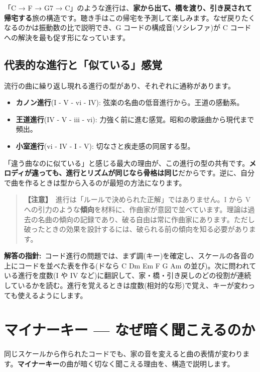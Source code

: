 \documentclass{article}
\begin{document}
「C → F → G7 → C」のような進行は、\textbf{家から出て、橋を渡り、引き戻されて帰宅する}旅の構造です。聴き手はこの帰宅を予測して楽しみます。なぜ戻りたくなるのかは振動数の比で説明でき、G コードの構成音(ソシレファ)が C コードへの解決を最も促す形になっています。

\subsection{代表的な進行と「似ている」感覚}

流行の曲に繰り返し現れる進行の型があり、それぞれに通称があります。

\begin{itemize}
\item \textbf{カノン進行}(I - V - vi - IV): 弦楽の名曲の低音進行から。王道の感動系。
\item \textbf{王道進行}(IV - V - iii - vi): 力強く前に進む感覚。昭和の歌謡曲から現代まで頻出。
\item \textbf{小室進行}(vi - IV - I - V): 切なさと疾走感の同居する型。
\end{itemize}

「違う曲なのに似ている」と感じる最大の理由が、この進行の型の共有です。\textbf{メロディが違っても、進行とリズムが同じなら骨格は同じ}だからです。逆に、自分で曲を作るときは型から入るのが最短の方法になります。

\begin{quote}
\textbf{【注意】}\ 進行は「ルールで決められた正解」ではありません。I から V への引力のような\textbf{傾向}を材料に、作曲家が意図で並べています。理論は過去の名曲の傾向の記録であり、破る自由は常に作曲家にあります。ただし破ったときの効果を設計するには、破られる前の傾向を知る必要があります。
\end{quote}

\textbf{解答の指針:}\ コード進行の問題では、まず調(キー)を確定し、スケールの各音の上にコードを並べた表を作る(ドなら C Dm Em F G Am の並び)。次に問われている進行を度数(I や IV など)に翻訳して、家・橋・引き戻しのどの役割が連続しているかを読む。進行を覚えるときは度数(相対的な形)で覚え、キーが変わっても使えるようにします。

\section{マイナーキー — なぜ暗く聞こえるのか}

同じスケールから作られたコードでも、家の音を変えると曲の表情が変わります。\textbf{マイナーキー}の曲が暗く切なく聞こえる理由を、構造で説明します。
\end{document}
